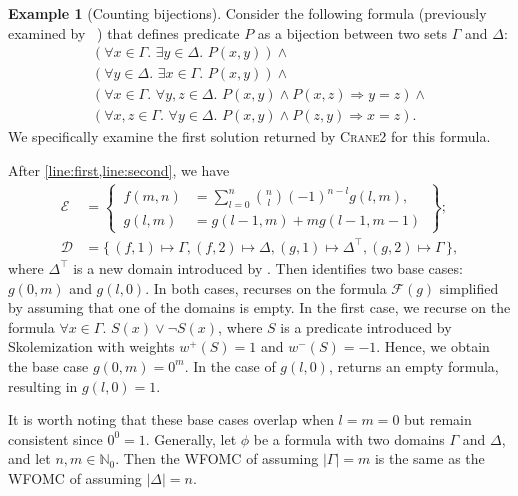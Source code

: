 \documentclass[letterpaper]{article} %
\theoremstyle{remark}
\theoremstyle{definition}
\newtheorem{example}{Example}
\newcommand{\Cranetwo}{\textsc{Crane2}}
\begin{document}
\begin{example}[Counting bijections]\label{example:overall}
  Consider the following formula (previously examined by
  \citeauthor{DBLP:conf/kr/DilkasB23}~) that
  defines predicate $P$ as a bijection between two sets $\Gamma$ and $\Delta$:
  \[
    \begin{gathered}
      (\forall x \in \Gamma\text{. }\exists y \in \Delta\text{. }P(x, y))\land{}\\
      (\forall y \in \Delta\text{. }\exists x \in \Gamma\text{. }P(x, y))\land{}\\
      (\forall x \in \Gamma\text{. }\forall y, z \in \Delta\text{. }P(x, y) \land P(x, z) \Rightarrow y = z)\land{}\\
      (\forall x, z \in \Gamma\text{. }\forall y \in \Delta\text{. }P(x, y) \land P(z, y) \Rightarrow x = z).
    \end{gathered}
  \]
  We specifically examine the first solution returned by \Cranetwo{} for this
  formula.

  After \cref{line:first,line:second}, we have
  \begin{align*}
    \mathcal{E} &= \left\{\,\begin{aligned}f(m, n) &= \sum_{l=0}^{n} \binom{n}{l}{(-1)}^{n-l}g(l, m),\\ g(l, m) &= g(l-1, m) + mg(l-1, m-1)\end{aligned}\,\right\};\\
    \mathcal{D} &= \{\, (f, 1) \mapsto \Gamma, (f, 2) \mapsto \Delta, (g, 1) \mapsto \Delta^{\top}, (g, 2) \mapsto \Gamma \,\},
  \end{align*}
  where $\Delta^{\top}$ is a new domain introduced by \Compile. Then
  \FindBaseCases identifies two base cases: $g(0, m)$ and $g(l, 0)$. In both
  cases, \CompileWithBaseCases recurses on the formula $\mathcal{F}(g)$
  simplified by assuming that one of the domains is empty. In the first case, we
  recurse on the formula $\forall x \in \Gamma\text{. }S(x) \lor \neg S(x)$,
  where $S$ is a predicate introduced by Skolemization with weights
  $w^{+}(S) = 1$ and $w^{-}(S) = -1$. Hence, we obtain the base case
  $g(0, m) = 0^{m}$. In the case of $g(l, 0)$, 
  returns an empty formula, resulting in $g(l, 0) = 1$.
\end{example}

It is worth noting that these base cases overlap when $l = m = 0$ but remain
consistent since $0^{0} = 1$. Generally, let $\phi$ be a formula with two
domains $\Gamma$ and $\Delta$, and let $n, m \in \mathbb{N}_{0}$. Then the WFOMC
of  assuming $|\Gamma| = m$ is the same as the
WFOMC of  assuming $|\Delta| = n$.
\end{document}
